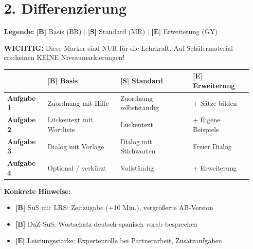 \documentclass[11pt, a4paper]{article}
\newcommand{\B}{\textcolor{basis}{\textbf{[B]}}}
\newcommand{\Std}{\textcolor{standard}{\textbf{[S]}}}
\newcommand{\E}{\textcolor{erweiterung}{\textbf{[E]}}}
\begin{document}

\section*{2. Differenzierung}

\begin{differenzierung}
\textbf{Legende:} \B{} Basis (BR) | \Std{} Standard (MR) | \E{} Erweiterung (GY)

\vspace{0.5em}

\textbf{WICHTIG:} Diese Marker sind NUR für die Lehrkraft. Auf Schülermaterial erscheinen KEINE Niveaumarkierungen!
\end{differenzierung}

\vspace{1em}

\begin{tabularx}{\textwidth}{|l|X|X|X|}
\hline
& \B{} \textbf{Basis} & \Std{} \textbf{Standard} & \E{} \textbf{Erweiterung} \\
\hline
\textbf{Aufgabe 1} & Zuordnung mit Hilfe & Zuordnung selbstständig & + Sätze bilden \\
\hline
\textbf{Aufgabe 2} & Lückentext mit Wortliste & Lückentext & + Eigene Beispiele \\
\hline
\textbf{Aufgabe 3} & Dialog mit Vorlage & Dialog mit Stichworten & Freier Dialog \\
\hline
\textbf{Aufgabe 4} & Optional / verkürzt & Vollständig & + Erweiterung \\
\hline
\end{tabularx}

\vspace{1em}

\textbf{Konkrete Hinweise:}
\begin{itemize}
    \item \B{} SuS mit LRS: Zeitzugabe (+10 Min.), vergrößerte AB-Version
    \item \B{} DaZ-SuS: Wortschatz deutsch-spanisch vorab besprechen
    \item \E{} Leistungsstarke: Expertenrolle bei Partnerarbeit, Zusatzaufgaben
\end{itemize}

\end{document}
